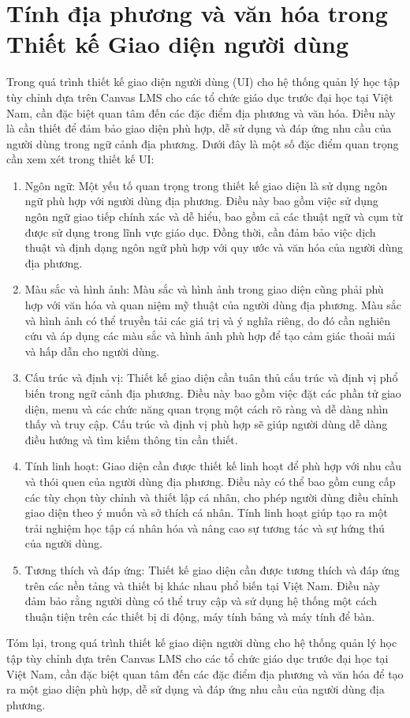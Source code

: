 \documentclass[../Thesis.tex]{subfiles}
\begin{document}
\section{Tính địa phương và văn hóa trong Thiết kế Giao diện người dùng}
Trong quá trình thiết kế giao diện người dùng (UI) cho hệ thống quản lý học tập tùy chỉnh dựa trên Canvas LMS cho các tổ chức giáo dục trước đại học tại Việt Nam, cần đặc biệt quan tâm đến các đặc điểm địa phương và văn hóa. Điều này là cần thiết để đảm bảo giao diện phù hợp, dễ sử dụng và đáp ứng nhu cầu của người dùng trong ngữ cảnh địa phương. Dưới đây là một số đặc điểm quan trọng cần xem xét trong thiết kế UI:

	\begin{enumerate}
		\item Ngôn ngữ: Một yếu tố quan trọng trong thiết kế giao diện là sử dụng ngôn ngữ phù hợp với người dùng địa phương. Điều này bao gồm việc sử dụng ngôn ngữ giao tiếp chính xác và dễ hiểu, bao gồm cả các thuật ngữ và cụm từ được sử dụng trong lĩnh vực giáo dục. Đồng thời, cần đảm bảo việc dịch thuật và định dạng ngôn ngữ phù hợp với quy ước và văn hóa của người dùng địa phương.

		\item Màu sắc và hình ảnh: Màu sắc và hình ảnh trong giao diện cũng phải phù hợp với văn hóa và quan niệm mỹ thuật của người dùng địa phương. Màu sắc và hình ảnh có thể truyền tải các giá trị và ý nghĩa riêng, do đó cần nghiên cứu và áp dụng các màu sắc và hình ảnh phù hợp để tạo cảm giác thoải mái và hấp dẫn cho người dùng.

		\item Cấu trúc và định vị: Thiết kế giao diện cần tuân thủ cấu trúc và định vị phổ biến trong ngữ cảnh địa phương. Điều này bao gồm việc đặt các phần tử giao diện, menu và các chức năng quan trọng một cách rõ ràng và dễ dàng nhìn thấy và truy cập. Cấu trúc và định vị phù hợp sẽ giúp người dùng dễ dàng điều hướng và tìm kiếm thông tin cần thiết.

		\item Tính linh hoạt: Giao diện cần được thiết kế linh hoạt để phù hợp với nhu cầu và thói quen của người dùng địa phương. Điều này có thể bao gồm cung cấp các tùy chọn tùy chỉnh và thiết lập cá nhân, cho phép người dùng điều chỉnh giao diện theo ý muốn và sở thích cá nhân. Tính linh hoạt giúp tạo ra một trải nghiệm học tập cá nhân hóa và nâng cao sự tương tác và sự hứng thú của người dùng.

		\item Tương thích và đáp ứng: Thiết kế giao diện cần được tương thích và đáp ứng trên các nền tảng và thiết bị khác nhau phổ biến tại Việt Nam. Điều này đảm bảo rằng người dùng có thể truy cập và sử dụng hệ thống một cách thuận tiện trên các thiết bị di động, máy tính bảng và máy tính để bàn.
	\end{enumerate}
	Tóm lại, trong quá trình thiết kế giao diện người dùng cho hệ thống quản lý học tập tùy chỉnh dựa trên Canvas LMS cho các tổ chức giáo dục trước đại học tại Việt Nam, cần đặc biệt quan tâm đến các đặc điểm địa phương và văn hóa để tạo ra một giao diện phù hợp, dễ sử dụng và đáp ứng nhu cầu của người dùng địa phương.
\end{document}
